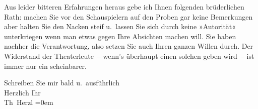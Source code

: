 \pstart
           Aus leider bitteren Erfahrungen heraus gebe ich Ihnen folgenden brüderlichen Rath:
               machen Sie vor den Schauspielern auf den Proben gar keine Bemerkungen aber halten Sie
               den Nacken steif u. lassen Sie sich durch keine »Autorität« unterkriegen wenn man
               etwas gegen Ihre {\pb}Absichten machen will.
               Sie haben nachher die Verantwortung, also setzen Sie auch Ihren ganzen Willen durch.
               Der Widerstand der Theaterleute – wenn’s überhaupt einen solchen geben wird – ist
               immer nur ein scheinbarer.\pend
           
\pstart
           Schreiben Sie mir bald u. ausführlich {\\[\baselineskip]}Herzlich Ihr {\\[\baselineskip]}\spacefill\mbox{Th Herzl}\pend
           \leftskip=0em{}\endnumbering{}
\begin{anhang}
\end{anhang}\newcommand{\dateiname}{L03852}\newcommand{\titel}{Theodor Herzl an Arthur Schnitzler, 4. 3. 1895}\newcommand{\editorInnen}{Selma Jahnke und Martin Anton Müller}
